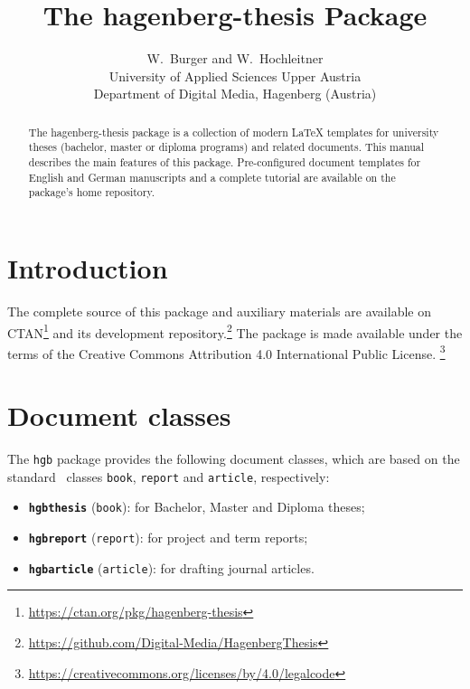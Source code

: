 \documentclass[english]{hgbarticle}
\title{The \textsf{hagenberg-thesis} Package}
\date{\hgbDate}
\author{W.\ Burger and W.\ Hochleitner\\[10pt]
University of Applied Sciences Upper Austria\\
Department of Digital Media, Hagenberg (Austria)}
\begin{document}
\maketitle

\begin{abstract}\noindent
The \textsf{hagenberg-thesis} package is a collection of modern LaTeX templates for university theses (bachelor, 
master or diploma programs) and related documents.
This manual describes the main features of this package.
Pre-configured document templates for English and German manuscripts and a complete
tutorial are available on the package's home repository.
\end{abstract}



\section{Introduction}

The complete source of this package and auxiliary materials are available on
CTAN\footnote{\url{https://ctan.org/pkg/hagenberg-thesis}}
and its development repository.\footnote{\url{https://github.com/Digital-Media/HagenbergThesis}}
The package is made available under the terms of the
Creative Commons Attribution 4.0 International Public License.%
\footnote{\url{https://creativecommons.org/licenses/by/4.0/legalcode}}


\section{Document classes}

The \texttt{hgb} package provides the following document classes,
which are based on the standard \latex\ classes
\texttt{book}, \texttt{report} and \texttt{article}, respectively:
%
\begin{itemize}
\item \textbf{\texttt{hgbthesis}} (\texttt{book}): 
for Bachelor, Master and Diploma theses;
\item \textbf{\texttt{hgbreport}} (\texttt{report}):
for project and term reports;
\item \textbf{\texttt{hgbarticle}} (\texttt{article}):
for drafting journal articles.
\end{itemize}
\end{document}
